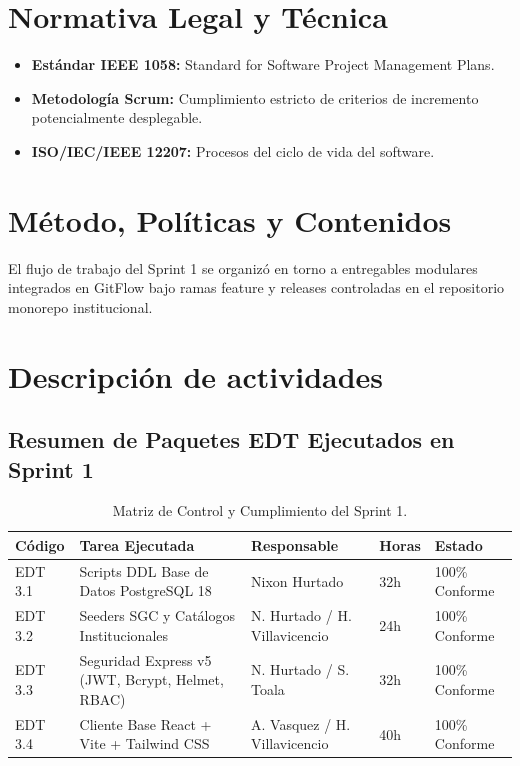 \documentclass[12pt,a4paper]{article}
\begin{document}
\section{Normativa Legal y Técnica}
\begin{itemize}[leftmargin=1.5em, itemsep=2pt, topsep=2pt]
    \item \textbf{Estándar IEEE 1058:} Standard for Software Project Management Plans.
    \item \textbf{Metodología Scrum:} Cumplimiento estricto de criterios de incremento potencialmente desplegable.
    \item \textbf{ISO/IEC/IEEE 12207:} Procesos del ciclo de vida del software.
\end{itemize}

\section{Método, Políticas y Contenidos}
El flujo de trabajo del Sprint 1 se organizó en torno a entregables modulares integrados en GitFlow bajo ramas feature y releases controladas en el repositorio monorepo institucional.

\section{Descripción de actividades}

\subsection{Resumen de Paquetes EDT Ejecutados en Sprint 1}

\begin{table}[htbp]
\centering
\small
\renewcommand{\arraystretch}{1.2}
\begin{tabularx}{\textwidth}{|l|X|l|l|l|}
\hline
\rowcolor{tableheader}
\textbf{Código} & \textbf{Tarea Ejecutada} & \textbf{Responsable} & \textbf{Horas} & \textbf{Estado} \\
\hline
EDT 3.1 & Scripts DDL Base de Datos PostgreSQL 18 & Nixon Hurtado & 32h & 100\% Conforme \\
\hline
EDT 3.2 & Seeders SGC y Catálogos Institucionales & N. Hurtado / H. Villavicencio & 24h & 100\% Conforme \\
\hline
EDT 3.3 & Seguridad Express v5 (JWT, Bcrypt, Helmet, RBAC) & N. Hurtado / S. Toala & 32h & 100\% Conforme \\
\hline
EDT 3.4 & Cliente Base React + Vite + Tailwind CSS & A. Vasquez / H. Villavicencio & 40h & 100\% Conforme \\
\hline
\end{tabularx}
\caption{Matriz de Control y Cumplimiento del Sprint 1.}
\end{table}
\end{document}

